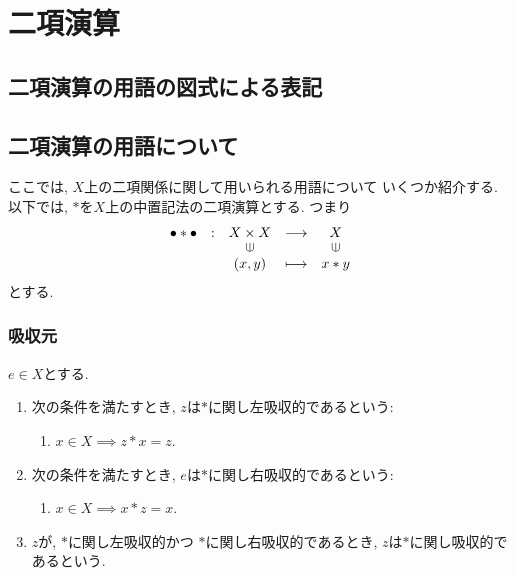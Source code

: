 \chapter{二項演算}
\section{二項演算の用語の図式による表記}
\section{二項演算の用語について}
ここでは, $X$上の二項関係に関して用いられる用語について
いくつか紹介する.
以下では,
$\ast$を$X$上の中置記法の二項演算とする.
つまり
\begin{align*}
  \shazo{\bullet\ast\bullet}
        {X\times X}{X}
        {(x,y)}{x\ast y}
\end{align*}
とする.
\subsection{吸収元}
\begin{definition}
  $e\in X$とする.
  \begin{enumerate}
  \item
    次の条件を満たすとき,
    $z$は$\ast$に関し左吸収的であるという:
    \begin{enumerate}
    \item $x\in X\implies z\ast x=z$.
    \end{enumerate}
  \item
    次の条件を満たすとき,
    $e$は$\ast$に関し右吸収的であるという:
    \begin{enumerate}
    \item $x\in X\implies x\ast z=x$.
    \end{enumerate}
  \item
    $z$が,
    $\ast$に関し左吸収的かつ
    $\ast$に関し右吸収的であるとき,
    $z$は$\ast$に関し吸収的であるという.
  \end{enumerate}
\end{definition}

